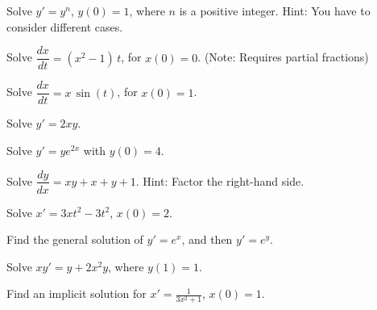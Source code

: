\documentclass{ximera}
\begin{document}
\begin{exercise}
    Solve $y' = y^n$, $y(0) = 1$, where $n$ is a positive integer. Hint: You have to consider different cases.
\end{exercise}


\begin{exercise}
    Solve $\dfrac{dx}{dt} = (x^2-1)\,t$, for $x(0) = 0$. (Note: Requires partial fractions)
\end{exercise}

\begin{exercise}
    Solve $\dfrac{dx}{dt} = x\,\sin(t)$, for $x(0) = 1$.
\end{exercise}

\begin{exercise}%
    Solve $y'=2xy$.
\end{exercise}

\begin{exercise}
    Solve $y' = ye^{2x}$ with $y(0) = 4$. 
\end{exercise}

\begin{exercise}
    Solve $\dfrac{dy}{dx} = xy+x+y+1$.  Hint: Factor the right-hand side.
\end{exercise}

\begin{exercise}%
    Solve $x'=3xt^2-3t^2$, $x(0)=2$.
\end{exercise}

\begin{exercise}
    Find the general solution of $y' = e^x$,  and then $y' = e^y$.
\end{exercise}

\begin{exercise}
    Solve $xy' = y + 2x^2 y$, where $y(1) = 1$.
\end{exercise}

\begin{exercise}%
    Find an implicit solution for $x'=\frac{1}{3x^2+1}$, $x(0)=1$.
\end{exercise}
\end{document}
